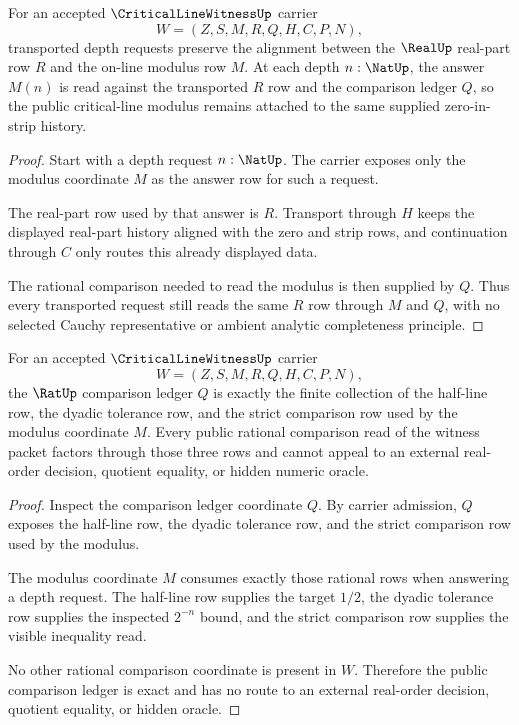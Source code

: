 \begin{theorem}
\label{thm:critical-line-witness-realpart-modulus-stability}
For an accepted $\CriticalLineWitnessUp$ carrier
$$
W=(Z,S,M,R,Q,H,C,P,N),
$$
transported depth requests preserve the alignment between the $\RealUp$ real-part row $R$ and the on-line modulus row $M$. At each depth $n:\NatUp$, the answer $M(n)$ is read against the transported $R$ row and the comparison ledger $Q$, so the public critical-line modulus remains attached to the same supplied zero-in-strip history.
\end{theorem}
\begin{proof}
Start with a depth request $n:\NatUp$. The carrier exposes only the modulus coordinate $M$ as the answer row for such a request.

The real-part row used by that answer is $R$. Transport through $H$ keeps the displayed real-part history aligned with the zero and strip rows, and continuation through $C$ only routes this already displayed data.

The rational comparison needed to read the modulus is then supplied by $Q$. Thus every transported request still reads the same $R$ row through $M$ and $Q$, with no selected Cauchy representative or ambient analytic completeness principle.
\end{proof}

\begin{theorem}
\label{thm:critical-line-witness-rat-comparison-ledger-exactness}
For an accepted $\CriticalLineWitnessUp$ carrier
$$
W=(Z,S,M,R,Q,H,C,P,N),
$$
the $\RatUp$ comparison ledger $Q$ is exactly the finite collection of the half-line row, the dyadic tolerance row, and the strict comparison row used by the modulus coordinate $M$. Every public rational comparison read of the witness packet factors through those three rows and cannot appeal to an external real-order decision, quotient equality, or hidden numeric oracle.
\end{theorem}
\begin{proof}
Inspect the comparison ledger coordinate $Q$. By carrier admission, $Q$ exposes the half-line row, the dyadic tolerance row, and the strict comparison row used by the modulus.

The modulus coordinate $M$ consumes exactly those rational rows when answering a depth request. The half-line row supplies the target $1/2$, the dyadic tolerance row supplies the inspected $2^{-n}$ bound, and the strict comparison row supplies the visible inequality read.

No other rational comparison coordinate is present in $W$. Therefore the public comparison ledger is exact and has no route to an external real-order decision, quotient equality, or hidden oracle.
\end{proof}

